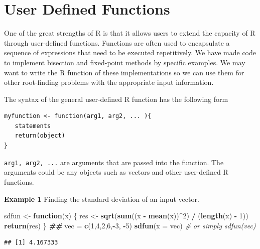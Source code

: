\documentclass[
]{book}
\newenvironment{Shaded}{\begin{snugshade}}{\end{snugshade}}
\newcommand{\AttributeTok}[1]{\textcolor[rgb]{0.13,0.29,0.53}{#1}}
\newcommand{\CommentTok}[1]{\textcolor[rgb]{0.56,0.35,0.01}{\textit{#1}}}
\newcommand{\ControlFlowTok}[1]{\textcolor[rgb]{0.13,0.29,0.53}{\textbf{#1}}}
\newcommand{\DecValTok}[1]{\textcolor[rgb]{0.00,0.00,0.81}{#1}}
\newcommand{\DocumentationTok}[1]{\textcolor[rgb]{0.56,0.35,0.01}{\textbf{\textit{#1}}}}
\newcommand{\FunctionTok}[1]{\textcolor[rgb]{0.13,0.29,0.53}{\textbf{#1}}}
\newcommand{\NormalTok}[1]{#1}
\newcommand{\OtherTok}[1]{\textcolor[rgb]{0.56,0.35,0.01}{#1}}
\newcommand{\SpecialCharTok}[1]{\textcolor[rgb]{0.81,0.36,0.00}{\textbf{#1}}}
\begin{document}
\hypertarget{user-defined-functions}{%
\section{User Defined Functions}\label{user-defined-functions}}

One of the great strengths of R is that it allows users to extend the capacity of R through user-defined functions. Functions are often used to encapsulate a sequence of expressions that need to be executed repetitively. We have made code to implement bisection and fixed-point methods by specific examples. We may want to write the R function of these implementations so we can use them for other root-finding problems with the appropriate input information.

The syntax of the general user-defined R function has the following form

\begin{verbatim}
myfunction <- function(arg1, arg2, ... ){
   statements
   return(object)
}
\end{verbatim}

\texttt{arg1,\ arg2,\ ...} are arguments that are passed into the function. The arguments could be any objects such as vectors and other user-defined R functions.

\textbf{Example 1} Finding the standard deviation of an input vector.

\begin{Shaded}
\begin{Highlighting}[]
\NormalTok{sdfun }\OtherTok{\textless{}{-}} \ControlFlowTok{function}\NormalTok{(x) \{}
\NormalTok{  res }\OtherTok{\textless{}{-}} \FunctionTok{sqrt}\NormalTok{(}\FunctionTok{sum}\NormalTok{((x }\SpecialCharTok{{-}} \FunctionTok{mean}\NormalTok{(x))}\SpecialCharTok{\^{}}\DecValTok{2}\NormalTok{) }\SpecialCharTok{/}\NormalTok{ (}\FunctionTok{length}\NormalTok{(x) }\SpecialCharTok{{-}} \DecValTok{1}\NormalTok{))}
  \FunctionTok{return}\NormalTok{(res)}
\NormalTok{\}}
\DocumentationTok{\#\#}
\NormalTok{vec }\OtherTok{=} \FunctionTok{c}\NormalTok{(}\DecValTok{1}\NormalTok{,}\DecValTok{4}\NormalTok{,}\DecValTok{2}\NormalTok{,}\DecValTok{6}\NormalTok{,}\SpecialCharTok{{-}}\DecValTok{3}\NormalTok{, }\SpecialCharTok{{-}}\DecValTok{5}\NormalTok{)}
\FunctionTok{sdfun}\NormalTok{(}\AttributeTok{x =}\NormalTok{ vec)   }\CommentTok{\# or simply sdfun(vec)}
\end{Highlighting}
\end{Shaded}

\begin{verbatim}
## [1] 4.167333
\end{verbatim}
\end{document}
